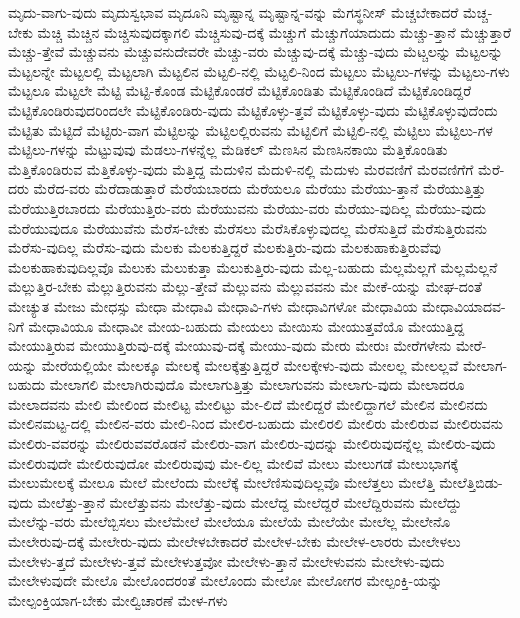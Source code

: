 {ಮೃದು-ವಾಗು-ವುದು
ಮೃದುಸ್ವಭಾವ
ಮೃದೂನಿ
ಮೃಷ್ಟಾನ್ನ
ಮೃಷ್ಟಾನ್ನ-ವನ್ನು
ಮೆಗಸ್ಥನೀಸ್
ಮೆಚ್ಚಬೇಕಾದರೆ
ಮೆಚ್ಚ-ಬೇಕು
ಮೆಚ್ಚಿ
ಮೆಚ್ಚಿನ
ಮೆಚ್ಚಿಸುವುದಕ್ಕಾಗಲಿ
ಮೆಚ್ಚಿಸುವು-ದಕ್ಕೆ
ಮೆಚ್ಚುಗೆ
ಮೆಚ್ಚುಗೆಯಾದುದು
ಮೆಚ್ಚು-ತ್ತಾನೆ
ಮೆಚ್ಚುತ್ತಾರೆ
ಮೆಚ್ಚು-ತ್ತೇವೆ
ಮೆಚ್ಚುವನು
ಮೆಚ್ಚುವನುದೇವರೇ
ಮೆಚ್ಚು-ವರು
ಮೆಚ್ಚುವು-ದಕ್ಕೆ
ಮೆಚ್ಚು-ವುದು
ಮೆಟ್ಚಲನ್ನು
ಮೆಟ್ಟಲನ್ನು
ಮೆಟ್ಟಲನ್ನೇ
ಮೆಟ್ಟಲಲ್ಲಿ
ಮೆಟ್ಟಲಾಗಿ
ಮೆಟ್ಟಲಿನ
ಮೆಟ್ಟಲಿ-ನಲ್ಲಿ
ಮೆಟ್ಟಲಿ-ನಿಂದ
ಮೆಟ್ಟಲು
ಮೆಟ್ಟಲು-ಗಳನ್ನು
ಮೆಟ್ಟಲು-ಗಳು
ಮೆಟ್ಟಲೂ
ಮೆಟ್ಟಲೇ
ಮೆಟ್ಟಿ
ಮೆಟ್ಟಿ-ಕೊಂಡ
ಮೆಟ್ಟಿಕೊಂಡರೆ
ಮೆಟ್ಟಿಕೊಂಡಿತು
ಮೆಟ್ಟಿಕೊಂಡಿದೆ
ಮೆಟ್ಟಿಕೊಂಡಿದ್ದರೆ
ಮೆಟ್ಟಿಕೊಂಡಿರುವುದರಿಂದಲೇ
ಮೆಟ್ಟಿಕೊಂಡಿರು-ವುದು
ಮೆಟ್ಟಿಕೊಳ್ಳು-ತ್ತವೆ
ಮೆಟ್ಟಿಕೊಳ್ಳು-ವುದು
ಮೆಟ್ಟಿಕೊಳ್ಳುವುದೆಂದು
ಮೆಟ್ಟಿತು
ಮೆಟ್ಟಿದೆ
ಮೆಟ್ಟಿರು-ವಾಗ
ಮೆಟ್ಟಿಲನ್ನು
ಮೆಟ್ಟಿಲಲ್ಲಿರುವನು
ಮೆಟ್ಟಿಲಿಗೆ
ಮೆಟ್ಟಿಲಿ-ನಲ್ಲಿ
ಮೆಟ್ಟಿಲು
ಮೆಟ್ಟಿಲು-ಗಳ
ಮೆಟ್ಟಿಲು-ಗಳನ್ನು
ಮೆಟ್ಟುವುವು
ಮೆಡಲು-ಗಳನ್ನೆಲ್ಲ
ಮೆಡಿಕಲ್
ಮೆಣಸಿನ
ಮೆಣಸಿನಕಾಯಿ
ಮೆತ್ತಿಕೊಂಡಿತು
ಮೆತ್ತಿಕೊಂಡಿರುವ
ಮೆತ್ತಿಕೊಳ್ಳು-ವುದು
ಮೆತ್ತಿದ್ದ
ಮೆದುಳಿನ
ಮೆದುಳಿ-ನಲ್ಲಿ
ಮೆದುಳು
ಮೆರವಣಿಗೆ
ಮೆರವಣಿಗೆಗೆ
ಮೆರೆ-ದರು
ಮೆರೆದ-ವರು
ಮೆರೆದಾಡುತ್ತಾರೆ
ಮೆರೆಯಬಾರದು
ಮೆರೆಯಲೂ
ಮೆರೆಯು
ಮೆರೆಯು-ತ್ತಾನೆ
ಮೆರೆಯುತ್ತಿತ್ತು
ಮೆರೆಯುತ್ತಿರಬಾರದು
ಮೆರೆಯುತ್ತಿರು-ವರು
ಮೆರೆಯುವನು
ಮೆರೆಯು-ವರು
ಮೆರೆಯು-ವುದಿಲ್ಲ
ಮೆರೆಯು-ವುದು
ಮೆರೆಯುವುದೂ
ಮೆರೆಯುವೆನು
ಮೆರೆಸ-ಬೇಕು
ಮೆರೆಸಲು
ಮೆರೆಸಿಕೊಳ್ಳುವುದಲ್ಲ
ಮೆರೆಸುತ್ತಿದೆ
ಮೆರೆಸುತ್ತಿರುವನು
ಮೆರೆಸು-ವುದಿಲ್ಲ
ಮೆರೆಸು-ವುದು
ಮೆಲಕು
ಮೆಲಕುತ್ತಿದ್ದರೆ
ಮೆಲಕುತ್ತಿರು-ವುದು
ಮೆಲಕುಹಾಕುತ್ತಿರುವೆವು
ಮೆಲಕುಹಾಕುವುದಿಲ್ಲವೊ
ಮೆಲುಕು
ಮೆಲುಕುತ್ತಾ
ಮೆಲುಕುತ್ತಿರು-ವುದು
ಮೆಲ್ಲ-ಬಹುದು
ಮೆಲ್ಲಮೆಲ್ಲಗೆ
ಮೆಲ್ಲಮೆಲ್ಲನೆ
ಮೆಲ್ಲುತ್ತಿರ-ಬೇಕು
ಮೆಲ್ಲುತ್ತಿರುವನು
ಮೆಲ್ಲು-ತ್ತೇವೆ
ಮೆಲ್ಲುವನು
ಮೆಲ್ಲುವವನು
ಮೇ
ಮೇಕೆ-ಯನ್ನು
ಮೇಘ-ದಂತೆ
ಮೇಚ್ಯುತ
ಮೇಜು
ಮೇಧಸ್ಸು
ಮೇಧಾ
ಮೇಧಾವಿ
ಮೇಧಾವಿ-ಗಳು
ಮೇಧಾವಿಗಳೋ
ಮೇಧಾವಿಯ
ಮೇಧಾವಿಯಾದವ-ನಿಗೆ
ಮೇಧಾವಿಯೂ
ಮೇಧಾವೀ
ಮೇಯ-ಬಹುದು
ಮೇಯಲು
ಮೇಯಿಸು
ಮೇಯುತ್ತವೆಯೊ
ಮೇಯುತ್ತಿದ್ದ
ಮೇಯುತ್ತಿರುವ
ಮೇಯುತ್ತಿರುವು-ದಕ್ಕೆ
ಮೇಯುವು-ದಕ್ಕೆ
ಮೇಯು-ವುದು
ಮೇರು
ಮೇರುಃ
ಮೇರೆಗಳೇನು
ಮೇರೆ-ಯನ್ನು
ಮೇರೆಯಲ್ಲಿಯೇ
ಮೇಲಕ್ಕೂ
ಮೇಲಕ್ಕೆ
ಮೇಲಕ್ಕೆತ್ತುತ್ತಿದ್ದರೆ
ಮೇಲಕ್ಕೇಳು-ವುದು
ಮೇಲಲ್ಲ
ಮೇಲಲ್ಲವೆ
ಮೇಲಾಗ-ಬಹುದು
ಮೇಲಾಗಲಿ
ಮೇಲಾಗಿರುವುದೊ
ಮೇಲಾಗುತ್ತಿತ್ತು
ಮೇಲಾಗುವನು
ಮೇಲಾಗು-ವುದು
ಮೇಲಾದರೂ
ಮೇಲಾದವನು
ಮೇಲಿ
ಮೇಲಿಂದ
ಮೇಲಿಟ್ಟ
ಮೇಲಿಟ್ಟು
ಮೇ-ಲಿದೆ
ಮೇಲಿದ್ದರೆ
ಮೇಲಿದ್ದಾಗಲೆ
ಮೇಲಿನ
ಮೇಲಿನದು
ಮೇಲಿನಮಟ್ಟ-ದಲ್ಲಿ
ಮೇಲಿನ-ವರು
ಮೇಲಿ-ನಿಂದ
ಮೇಲಿರ-ಬಹುದು
ಮೇಲಿರಲಿ
ಮೇಲಿರು
ಮೇಲಿರುವ
ಮೇಲಿರುವನು
ಮೇಲಿರು-ವವರನ್ನು
ಮೇಲಿರುವವರೊಡನೆ
ಮೇಲಿರು-ವಾಗ
ಮೇಲಿರು-ವುದನ್ನು
ಮೇಲಿರುವುದನ್ನೆಲ್ಲ
ಮೇಲಿರು-ವುದು
ಮೇಲಿರುವುದೇ
ಮೇಲಿರುವುದೋ
ಮೇಲಿರುವುವು
ಮೇ-ಲಿಲ್ಲ
ಮೇಲಿವೆ
ಮೇಲು
ಮೇಲುಗಡೆ
ಮೇಲುಭಾಗಕ್ಕೆ
ಮೇಲುಮೇಲಕ್ಕೆ
ಮೇಲೂ
ಮೇಲೆ
ಮೇಲೆಂದು
ಮೇಲೆಕ್ಕೆ
ಮೇಲೆಣಿಸುವುದಿಲ್ಲವೊ
ಮೇಲೆತ್ತಲು
ಮೇಲೆತ್ತಿ
ಮೇಲೆತ್ತಿಬಿಡು-ವುದು
ಮೇಲೆತ್ತು-ತ್ತಾನೆ
ಮೇಲೆತ್ತುವನು
ಮೇಲೆತ್ತು-ವುದು
ಮೇಲೆದ್ದ
ಮೇಲೆದ್ದರೆ
ಮೇಲೆದ್ದಿರುವನು
ಮೇಲೆದ್ದು
ಮೇಲೆನ್ನು-ವರು
ಮೇಲೆಬ್ಬಿಸಲು
ಮೇಲೆಮೇಲೆ
ಮೇಲೆಯೂ
ಮೇಲೆಯೆ
ಮೇಲೆಯೇ
ಮೇಲೆಲ್ಲ
ಮೇಲೇನೊ
ಮೇಲೇರುವು-ದಕ್ಕೆ
ಮೇಲೇರು-ವುದು
ಮೇಲೇಳಬೇಕಾದರೆ
ಮೇಲೇಳ-ಬೇಕು
ಮೇಲೇಳ-ಲಾರರು
ಮೇಲೇಳಲು
ಮೇಲೇಳು-ತ್ತದೆ
ಮೇಲೇಳು-ತ್ತವೆ
ಮೇಲೇಳುತ್ತವೋ
ಮೇಲೇಳು-ತ್ತಾನೆ
ಮೇಲೇಳುವನು
ಮೇಲೇಳು-ವುದು
ಮೇಲೇಳುವುದೇ
ಮೇಲೊ
ಮೇಲೊಂದರಂತೆ
ಮೇಲೊಂದು
ಮೇಲೋ
ಮೇಲೋಗರ
ಮೇಲ್ಪಂಕ್ತಿ-ಯನ್ನು
ಮೇಲ್ಪಂಕ್ತಿಯಾಗ-ಬೇಕು
ಮೇಲ್ವಿಚಾರಣೆ
ಮೇಳ-ಗಳು
}
